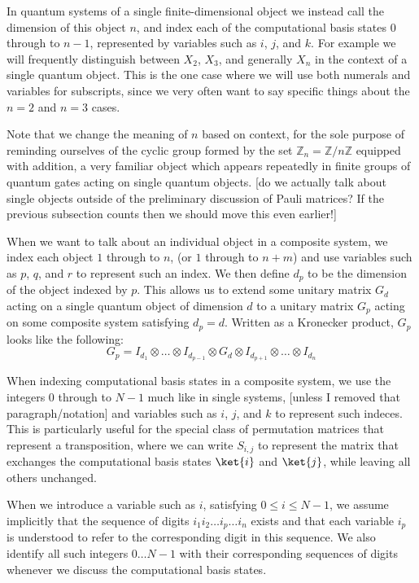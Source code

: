 In quantum systems of a single finite-dimensional object we instead call the dimension of this object $n$, and index each of the computational basis states $0$ through to $n-1$, represented by variables such as $i$, $j$, and $k$. For example we will frequently distinguish between $X_2$, $X_3$, and generally $X_n$ in the context of a single quantum object. This is the one case where we will use both numerals and variables for subscripts, since we very often want to say specific things about the $n=2$ and $n=3$ cases.

Note that we change the meaning of $n$ based on context, for the sole purpose of reminding ourselves of the cyclic group formed by the set $\mathbb{Z}_n = \mathbb{Z}/n\mathbb{Z}$ equipped with addition, a very familiar object which appears repeatedly in finite groups of quantum gates acting on single quantum objects.
[do we actually talk about single objects outside of the preliminary discussion of Pauli matrices? If the previous subsection counts then we should move this even earlier!]

When we want to talk about an individual object in a composite system, we index each object $1$ through to $n$, (or $1$ through to $n+m$) and use variables such as $p$, $q$, and $r$ to represent such an index. We then define $d_p$ to be the dimension of the object indexed by $p$. This allows us to extend some unitary matrix $G_d$ acting on a single quantum object of dimension $d$ to a unitary matrix $G_p$ acting on some composite system satisfying $d_p = d$. Written as a Kronecker product, $G_p$ looks like the following:
\[G_p = I_{d_1}\otimes \dots \otimes I_{d_{p-1}} \otimes G_d \otimes I_{d_{p+1}} \otimes \dots \otimes I_{d_n}\]

When indexing computational basis states in a composite system, we use the integers $0$ through to $N-1$ much like in single systems, [unless I removed that paragraph/notation] and variables such as $i$, $j$, and $k$ to represent such indeces. This is particularly useful for the special class of permutation matrices that represent a transposition, where we can write $S_{i,j}$ to represent the matrix that exchanges the computational basis states $\ket{i}$ and $\ket{j}$, while leaving all others unchanged.

When we introduce a variable such as $i$, satisfying $0 \leq i \leq N-1$, we assume implicitly that the sequence of digits $i_1i_2\dots i_p \dots i_n$ exists and that each variable $i_p$ is understood to refer to the corresponding digit in this sequence. We also identify all such integers $0\dots N-1$ with their corresponding sequences of digits whenever we discuss the computational basis states.

